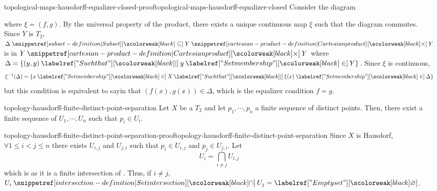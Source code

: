 \documentclass[preview]{standalone}
\begin{document}
\begin{snippetproof}{topological-maps-hausdorff-equalizer-closed-proof}{topological-maps-hausdorff-equalizer-closed}{}
    Consider the diagram
    \begin{center}
    \end{center}
    where \(\xi = (f,g)\).
    By the universal property of the product, there exists a unique continuous map \(\xi\)
    such that the diagram commutes.
    Since \(Y\) is \(T_2\), \(\Delta \subseteq Y \cartesianprod Y\) is \closedset[closed]
    in \(Y \cartesianprod Y\) where \(\Delta = \{(y,y) \suchthat y \in Y\}\).
    Since \(\xi\) is continuous,
    \[
        \xi^{-1}(\Delta) = \{x \in X \suchthat \xi(x) \in \Delta\}
    \]
    but this condition is equivalent to sayin that \((f(x), g(x)) \in \Delta\),
    which is the equalizer condition \(f=g\).
\end{snippetproof}


\begin{snippetlemma}{topology-hausdorff-finite-distinct-point-separation}{}
    Let \(X\) be a \(T_2\) \topologicalspace
    and let \(p_1, \cdots, p_n\) a finite sequence of distinct points.
    Then, there exist a finite sequence of \disjoint {}
    \(U_1, \cdots, U_n\) such that \(p_i \in U_i\).
\end{snippetlemma}

\begin{snippetproof}{topology-hausdorff-finite-distinct-point-separation-proof}{topology-hausdorff-finite-distinct-point-separation}{}
    Since \(X\) is Hausdorf,
    \(\forall 1 \leq i < j \leq n\)
    there exists \disjoint {} \(U_{i,j}\) and \(U_{j,i}\)
    such that \(p_i \in U_{i,j}\) and \(p_j \in U_{j,i}\).
    Let \[
        U_i = \bigcap_{i \neq j} U_{i,j}
    \]
    which is  as it is a finite intersection of .
    Thus, if \(i \neq j\), \(U_i \intersection U_j = \emptyset\).
\end{snippetproof}
\end{document}
